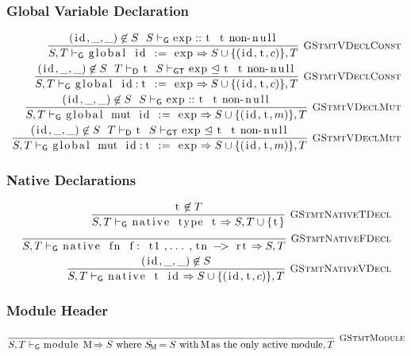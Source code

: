 \documentclass{article}
\newcommand{\code}[1]{\lstinline[columns=fixed]{#1}}
\newcommand{\drmrule}[5]{\frac{#1}{#2\vdash_{\mathsf{#3}}#4}\textsc{\ \small{#5}}}
\newcommand{\ruleapp}[1]{\vdash_{\mathsf{#1}}}
\newcommand{\mc}[1]{\textnormal{\code{#1}}}
\begin{document}
			\subsubsection{Global Variable Declaration}
			
				\begin{align*}
					\drmrule{(\mc{id},\_,\_) \not\in S\ \ S\ruleapp{G}\mc{exp} :: \mc{t}\ \ \mc{t}\textnormal{ non-\code{null}}}{S,T}{G}{\mc{global id := exp} \Rightarrow S\cup\{(\mc{id},\mc{t},c)\},T}{GStmtVDeclConst}\\
					\drmrule{(\mc{id},\_,\_) \not\in S\ \ T\ruleapp{D}\mc{t}\ \ S\ruleapp{GT}\mc{exp}\trianglelefteq\mc{t}\ \ \mc{t}\textnormal{ non-\code{null}}}{S,T}{G}{\mc{global id:t := exp} \Rightarrow S\cup\{(\mc{id},\mc{t},c)\},T}{GStmtVDeclConst}\\
					\drmrule{(\mc{id},\_,\_) \not\in S\ \ S\ruleapp{G}\mc{exp} :: \mc{t}\ \ \mc{t}\textnormal{ non-\code{null}}}{S,T}{G}{\mc{global mut id := exp} \Rightarrow S\cup\{(\mc{id},\mc{t},m)\},T}{GStmtVDeclMut}\\
					\drmrule{(\mc{id},\_,\_) \not\in S\ \ T\ruleapp{D}\mc{t}\ \ S\ruleapp{GT}\mc{exp}\trianglelefteq\mc{t}\ \ \mc{t}\textnormal{ non-\code{null}}}{S,T}{G}{\mc{global mut id:t := exp} \Rightarrow S\cup\{(\mc{id},\mc{t},m)\},T}{GStmtVDeclMut}
				\end{align*}
				
			\subsubsection{Native Declarations}
			
				\begin{align*}
					\drmrule{\mc{t}\not\in T}{S,T}{G}{\mc{native type t} \Rightarrow S,T\cup\{\mc{t}\}}{GStmtNativeTDecl}\\
					\drmrule{}{S,T}{G}{\mc{native fn f: t1,...,tn -> rt} \Rightarrow S,T}{GStmtNativeFDecl}\\
					\drmrule{(\mc{id},\_,\_)\not\in S}{S,T}{G}{\mc{native t id} \Rightarrow S\cup\{(\mc{id},\mc{t},c)\},T}{GStmtNativeVDecl}
				\end{align*}
				
			\subsubsection{Module Header}
			
				\begin{align*}
					\drmrule{}{S,T}{G}{\mc{module M} \Rightarrow S \textnormal{ where $S_{\mc{M}} = S$ with \code{M} as the only active module},T}{GStmtModule}
				\end{align*}
			
\end{document}
